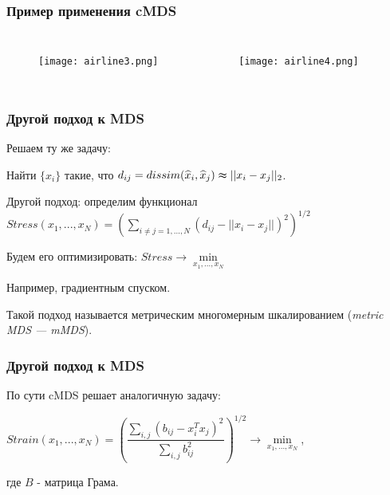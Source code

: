 \documentclass[10pt]{beamer}
\begin{document}
\begin{frame}
\frametitle{Пример применения cMDS}

\begin{columns}[t] %

\begin{figure}
\centering
        \texttt{[image: airline3.png]}
\end{figure}

\begin{figure}
\centering
        \texttt{[image: airline4.png]}
\end{figure}
\end{columns}

\end{frame}

\begin{frame}
\frametitle{Другой подход к MDS}

Решаем ту же задачу:

Найти $\{x_i\}$ такие, что $d_{ij} = dissim(\widehat{x}_i, \widehat{x}_j) \thickapprox ||x_i - x_j||_2$.


\vspace{\baselineskip}
Другой подход: определим функционал $Stress(x_1, ..., x_N)  = \left( \sum\limits_{i \neq j = 1,..., N} (d_{ij} - ||x_i - x_j||)^2 \right)^{1/2}$

\vspace{\baselineskip}
Будем его оптимизировать: $Stress \rightarrow \min\limits_{x_1, ..., x_N}$

Например, градиентным спуском.

\vspace{\baselineskip}
Такой подход называется метрическим многомерным шкалированием (\textit{metric MDS --- mMDS}).
\end{frame}

\begin{frame}
\frametitle{Другой подход к MDS}

По сути cMDS решает аналогичную задачу:

\vspace{\baselineskip}
\vspace{\baselineskip}
\vspace{\baselineskip}
$Strain(x_1, ..., x_N)  = \left( \dfrac{\sum\limits_{i, j} (b_{ij} - x_i^Tx_j)^2 }{\sum\limits_{i, j} b_{ij}^2}\right)^{1/2} \rightarrow \min\limits_{x_1, ..., x_N}$, 

где $B$ - матрица Грама.
\end{frame}
\end{document}

